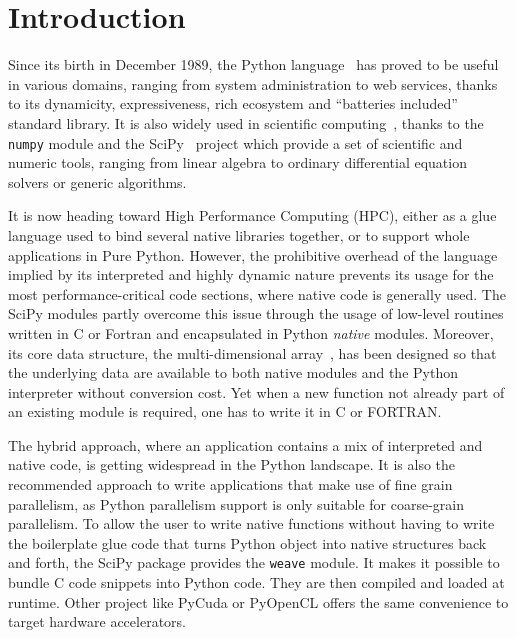\documentclass[conference]{IEEEtran}
\begin{document}
%
\section{Introduction}

Since its birth in December 1989, the Python language~\cite{rossum97} has proved
to be useful in various domains, ranging from system administration to web
services, thanks to its dynamicity, expressiveness, rich ecosystem and
``batteries included'' standard library. It is also widely used in scientific
computing~\cite{Oliphant2007}, thanks to the \texttt{numpy} module and the
SciPy~\cite{scipy} project which provide a set of scientific and numeric tools,
ranging from linear algebra to ordinary differential equation solvers or generic
algorithms.

It is now heading toward High Performance Computing (HPC), either as a glue
language used to bind several native libraries together, or to support whole
applications in Pure Python. However, the prohibitive overhead of the language
implied by its interpreted and highly dynamic nature prevents its usage for the
most performance-critical code sections, where native code is generally used.
The SciPy modules partly overcome this issue through the usage of low-level
routines written in C or Fortran and encapsulated in Python \emph{native}
modules. Moreover, its core data structure, the multi-dimensional
array~\cite{numpyarray2011}, has been designed so that the underlying data are
available to both native modules and the Python interpreter without conversion
cost. Yet when a new function not already part of an existing module is
required, one has to write it in C or FORTRAN.

The hybrid approach, where an application contains a mix of interpreted and
native code, is getting widespread in the Python landscape.
It is also the recommended approach to write applications that make use of fine
grain parallelism, as Python parallelism support is only suitable for
coarse-grain parallelism.
To allow the user to write native functions without having to write the
boilerplate glue code that turns Python object into native structures back and
forth, the SciPy package provides the \texttt{weave} module. It makes it
possible to bundle C code snippets into Python code. They are then compiled and
loaded at runtime. Other project like PyCuda or PyOpenCL offers the same
convenience to target hardware accelerators.
\end{document}

